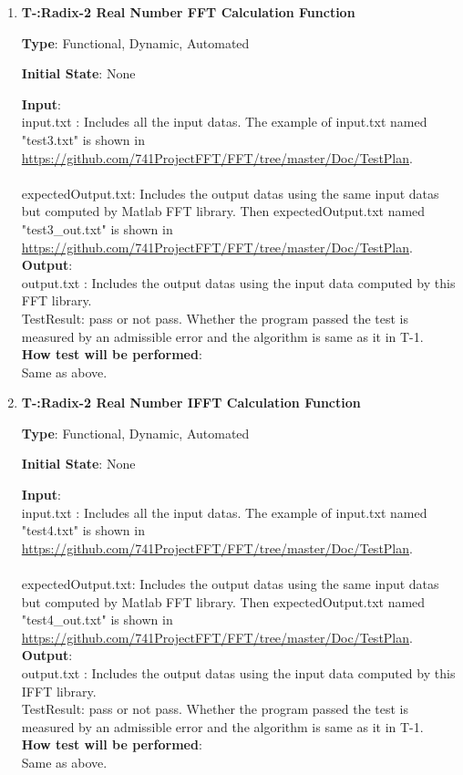 \documentclass[12pt, titlepage]{article}
\newcounter{tnum}
\begin{document}
\begin{enumerate}

\item{\textbf{T-\thetnum \label{R2RFFT}:Radix-2 Real Number FFT Calculation Function}}

\textbf {Type}: Functional, Dynamic, Automated
					
\textbf {Initial State}: None
					
\textbf {Input}:\\{\large input.txt} :  Includes all the input datas. The example of input.txt named "test3.txt" is shown in \url{https://github.com/741ProjectFFT/FFT/tree/master/Doc/TestPlan}.\\\\
{\large expectedOutput.txt}:    Includes the output datas using the same input datas but computed by Matlab FFT library. Then expectedOutput.txt named "test3\_out.txt" is shown in \url{https://github.com/741ProjectFFT/FFT/tree/master/Doc/TestPlan}. \\ 

					
\textbf {Output}: \\{\large output.txt} : Includes the output datas using the input data computed by this FFT library.\\
{\large TestResult}: pass or not pass. Whether the program passed the test is measured by an admissible error and the algorithm is same as it in T-1.\\
					
\textbf {How test will be performed}: \\
Same as above.

\item{\textbf{T-\thetnum \label{R2RIFFT}:Radix-2 Real Number IFFT Calculation Function}}

\textbf {Type}: Functional, Dynamic, Automated
					
\textbf {Initial State}: None
										
\textbf {Input}:\\{\large input.txt} :   Includes all the input datas. The example of input.txt named "test4.txt" is shown in \url{https://github.com/741ProjectFFT/FFT/tree/master/Doc/TestPlan}.\\ \\
{\large expectedOutput.txt}: Includes the output datas using the same input datas but computed by Matlab FFT library. Then expectedOutput.txt named "test4\_out.txt" is shown in \url{https://github.com/741ProjectFFT/FFT/tree/master/Doc/TestPlan}. \\ 
					
\textbf {Output}: \\{\large output.txt} : Includes the output datas using the input data computed by this IFFT library.\\
{\large TestResult}: pass or not pass. Whether the program passed the test is measured by an admissible error and the algorithm is same as it in T-1.\\
					

\textbf {How test will be performed}: \\
Same as above.
\end{enumerate}
\end{document}

